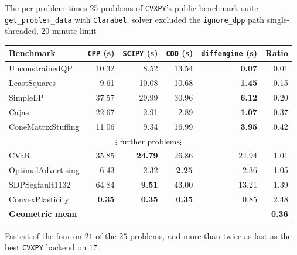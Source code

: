 \documentclass[10pt,mathserif,aspectratio=169]{beamer}
\newcommand{\de}{\texttt{diffengine}}
\newcommand{\cvxpy}{\texttt{CVXPY}}
\begin{document}
\begin{frame}[label=bk-pertimes]{The per-problem times}
\vspace{-1ex}
{\scriptsize\color{black!55} 25 problems of \cvxpy{}'s public benchmark suite \textbullet{}
\texttt{get\_problem\_data} with \texttt{Clarabel}, solver excluded \textbullet{} the
\texttt{ignore\_dpp} path \textbullet{} single-threaded, 20-minute limit}

\vspace{1.5ex}
\begin{center}\footnotesize
\begin{tabular}{@{}l r r r r r@{}}
\toprule
Benchmark & \texttt{CPP} (s) & \texttt{SCIPY} (s) & \texttt{COO} (s) & \de{} (s) & Ratio \\
\midrule
UnconstrainedQP        & 10.32 &  8.52 & 13.54 &  \textbf{0.07} & 0.01 \\
LeastSquares           &  9.61 & 10.08 & 10.68 &  \textbf{1.45} & 0.15 \\
SimpleLP               & 37.57 & 29.99 & 30.96 &  \textbf{6.12} & 0.20 \\
Cajas                  & 22.67 &  2.91 &  2.89 &  \textbf{1.07} & 0.37 \\
ConeMatrixStuffing     & 11.06 &  9.34 & 16.99 &  \textbf{3.95} & 0.42 \\
\multicolumn{6}{c}{\color{black!45}$\vdots$\quad 16 further problems\quad$\vdots$} \\
CVaR                   & 35.85 & \textbf{24.79} & 26.86 & 24.94 & 1.01 \\
OptimalAdvertising     &  6.43 &  2.32 &  \textbf{2.25} &  2.36 & 1.05 \\
SDPSegfault1132        & 64.84 &  \textbf{9.51} & 43.00 & 13.21 & 1.39 \\
ConvexPlasticity       &  \textbf{0.35} & \textbf{0.35} & \textbf{0.35} &  0.85 & 2.48 \\
\midrule
\textbf{Geometric mean} &      &       &       &       & \textbf{0.36} \\
\bottomrule
\end{tabular}
\end{center}

\vspace{1ex}
\begin{center}\small
Fastest of the four on $21$ of the $25$ problems, and more than twice as fast as the best
\cvxpy{} backend on $17$.\\[0.4ex]
\end{center}
\end{frame}
\end{document}

